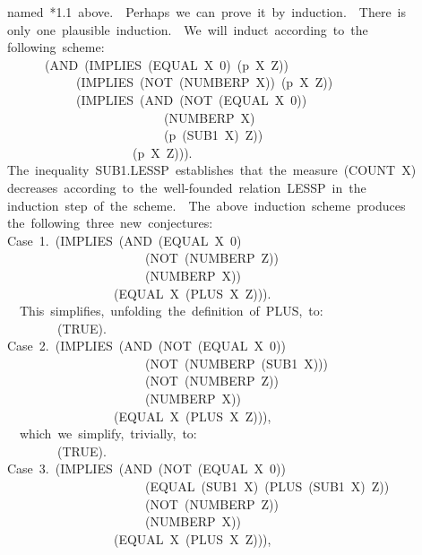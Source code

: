 \documentclass[11pt]{book}
\newenvironment{pubasis}{\begin{flushleft}\ttfamily\small}{\normalsize\rmfamily\end{flushleft}}
\begin{document}
\begin{pubasis}
named~*1.1~above.~~Perhaps~we~can~prove~it~by~induction.~~There~is\\
only~one~plausible~induction.~~We~will~induct~according~to~the\\
following~scheme:\\
~~~~~~(AND~(IMPLIES~(EQUAL~X~0)~(p~X~Z))\\
~~~~~~~~~~~(IMPLIES~(NOT~(NUMBERP~X))~(p~X~Z))\\
~~~~~~~~~~~(IMPLIES~(AND~(NOT~(EQUAL~X~0))\\
~~~~~~~~~~~~~~~~~~~~~~~~~(NUMBERP~X)\\
~~~~~~~~~~~~~~~~~~~~~~~~~(p~(SUB1~X)~Z))\\
~~~~~~~~~~~~~~~~~~~~(p~X~Z))).\\
The~inequality~SUB1.LESSP~establishes~that~the~measure~(COUNT~X)\\
decreases~according~to~the~well-founded~relation~LESSP~in~the\\
induction~step~of~the~scheme.~~The~above~induction~scheme~produces\\
the~following~three~new~conjectures:\\

Case~1.~(IMPLIES~(AND~(EQUAL~X~0)\\
~~~~~~~~~~~~~~~~~~~~~~(NOT~(NUMBERP~Z))\\
~~~~~~~~~~~~~~~~~~~~~~(NUMBERP~X))\\
~~~~~~~~~~~~~~~~~(EQUAL~X~(PLUS~X~Z))).\\

~~This~simplifies,~unfolding~the~definition~of~PLUS,~to:\\

~~~~~~~~(TRUE).\\

Case~2.~(IMPLIES~(AND~(NOT~(EQUAL~X~0))\\
~~~~~~~~~~~~~~~~~~~~~~(NOT~(NUMBERP~(SUB1~X)))\\
~~~~~~~~~~~~~~~~~~~~~~(NOT~(NUMBERP~Z))\\
~~~~~~~~~~~~~~~~~~~~~~(NUMBERP~X))\\
~~~~~~~~~~~~~~~~~(EQUAL~X~(PLUS~X~Z))),\\

~~which~we~simplify,~trivially,~to:\\

~~~~~~~~(TRUE).\\

Case~3.~(IMPLIES~(AND~(NOT~(EQUAL~X~0))\\
~~~~~~~~~~~~~~~~~~~~~~(EQUAL~(SUB1~X)~(PLUS~(SUB1~X)~Z))\\
~~~~~~~~~~~~~~~~~~~~~~(NOT~(NUMBERP~Z))\\
~~~~~~~~~~~~~~~~~~~~~~(NUMBERP~X))\\
~~~~~~~~~~~~~~~~~(EQUAL~X~(PLUS~X~Z))),\\


\end{pubasis}
\end{document}
